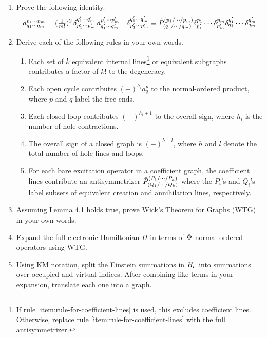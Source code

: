\documentclass[11pt]{article}
\begin{document}
\begin{enumerate}
\item
  Prove the following identity.
\begin{align}
  \tilde{a}^{p_1\cdots p_m}_{q_1\cdots q_m}
=
  (\tfrac{1}{m!})^2\,
  \overline{\delta }_{p_1'\cdots p_m'}^{q_1'\cdots q_m'}\,
  \tilde{a}^{p_1'\cdots p_m'}_{q_1'\cdots q_m'}
&&
  \overline{\delta }^{q_1'\cdots q_m'}_{p_1'\cdots p_m'}
\equiv
  \hat{P}^{(p_1/\cdots /p_m)}
        _{(q_1/\cdots /q_m)}
  \delta ^{p_1}_{p_1'}\cdots \delta ^{p_m}_{p_m'}
  \delta ^{q_1'}_{q_1}\cdots \delta ^{q_m'}_{q_m}
\end{align}

\item
  Derive each of the following rules in your own words.
{\small
\begin{enumerate}
\item
  Each set of $k$ equivalent internal lines\footnote{If rule \ref{item:rule-for-coefficient-lines} is used, this excludes coefficient lines.  Otherwise, replace rule \ref{item:rule-for-coefficient-lines} with the full antisymmetrizer.} or equivalent subgraphs contributes a factor of $k!$ to the degeneracy.
\item
  Each open cycle contributes $(-)^{h_i}a^p_q$ to the normal-ordered product, where $p$ and $q$ label the free ends.
\item
  Each closed loop contributes $(-)^{h_i+1}$ to the overall sign, where $h_i$ is the number of hole contractions.
\item
  The overall sign of a closed graph is $(-)^{h+l}$, where $h$ and $l$ denote the total number of hole lines and loops.
\item\label{item:rule-for-coefficient-lines}
  For each bare excitation operator in a coefficient graph, the coefficient lines contribute an antisymmetrizer
  $\hat{P}^{(P_1/\cdots /P_h)}_{(Q_1/\cdots /Q_k)}$
  where the $P_i$'s and $Q_i$'s label subsets of equivalent creation and annihilation lines, respectively.
\end{enumerate}}

\item
  Assuming Lemma 4.1 holds true, prove Wick's Theorem for Graphs (WTG) in your own words.

\item
  Expand the full electronic Hamiltonian $H$ in terms of $\Phi $-normal-ordered operators using WTG.

\item
  Using KM notation, split the Einstein summations in $H_{\mathrm{c}}$ into summations over occupied and virtual indices.
  After combining like terms in your expansion, translate each one into a graph.


\end{enumerate}
\end{document}
